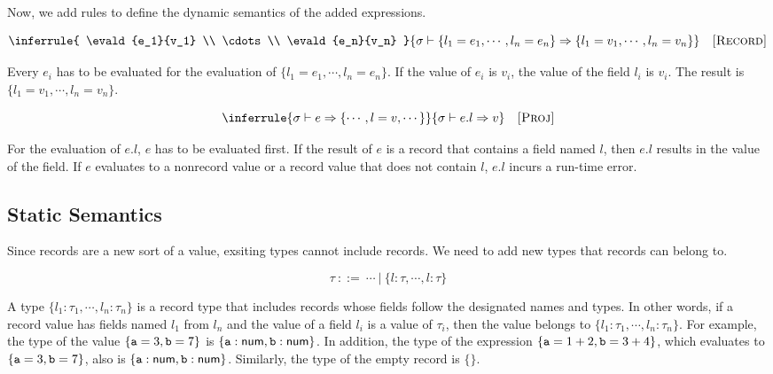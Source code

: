 Now, we add rules to define the dynamic semantics of the added expressions.


\vspace{-1em}

\[
  \inferrule
  { \evald{e_1}{v_1} \\
    \cdots \\
    \evald{e_n}{v_n} }
  { \evald{\{l_1=e_1,\cdots,l_n=e_n\}}{\{l_1=v_1,\cdots,l_n=v_n\}} }
  \quad\textsc{[Record]}
\]

Every $e_i$ has to be evaluated for the evaluation of
$\{l_1=e_1,\cdots,l_n=e_n\}$. If the value of $e_i$ is $v_i$, the value of
the field $l_i$ is $v_i$. The result is $\{l_1=v_1,\cdots,l_n=v_n\}$.


\vspace{-1em}

\[
  \inferrule
  { \evald{e}{\{\cdots,l=v,\cdots\}} }
  { \evald{e.l}{v} }
  \quad\textsc{[Proj]}
\]

For the evaluation of $e.l$, $e$ has to be evaluated first.
If the result of $e$ is a record that contains a field named $l$, then
$e.l$ results in the value of the field.
If $e$ evaluates to a nonrecord value or a record value that
does not contain $l$, $e.l$ incurs a run-time error.

\subsection{Static Semantics}

Since records are a new sort of a value, exsiting types cannot include records.
We need to add new types that records can belong to.

\[ \tau \ ::= \ \cdots \ |\ \{l:\tau,\cdots,l:\tau\} \]

A type $\{l_1:\tau_1,\cdots,l_n:\tau_n\}$ is a record type that includes
records whose fields follow the designated names and types. In other words, if a
record value has fields named $l_1$ from $l_n$ and the value of a field $l_i$ is
a value of $\tau_i$, then the value belongs to
$\{l_1:\tau_1,\cdots,l_n:\tau_n\}$. For example, the type of the value $\{\texttt{a}=3,\texttt{b}=7\}$ is
$\{\texttt{a}:\textsf{num},\texttt{b}:\textsf{num}\}$. In addition, the type of the expression
$\{\texttt{a}=1+2,\texttt{b}=3+4\}$, which evaluates to $\{\texttt{a}=3,\texttt{b}=7\}$, also is
$\{\texttt{a}:\textsf{num},\texttt{b}:\textsf{num}\}$. Similarly, the type of the empty record is $\{\}$.


